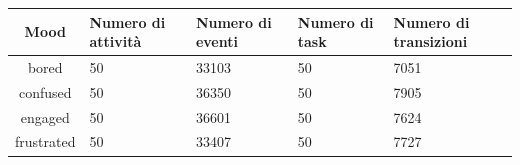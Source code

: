 \begin{table}
    \small
    \centering
    \begin{tabular}{|c|p{2.8cm}|p{2.8cm}|p{2.8cm}|p{2.8cm}|}
        \hline
        Mood       &   Numero di \newline attività &   Numero di eventi &   Numero di task &   Numero di \newline transizioni \\
        \hline
        bored      &                 50 &          33103 &            50 &                7051 \\
        \hline
        confused   &                 50 &          36350 &            50 &                7905 \\
        \hline
        engaged    &                 50 &          36601 &            50 &                7624 \\
        \hline
        frustrated &                 50 &          33407 &            50 &                7727 \\
        \hline
    \end{tabular}
\end{table}

